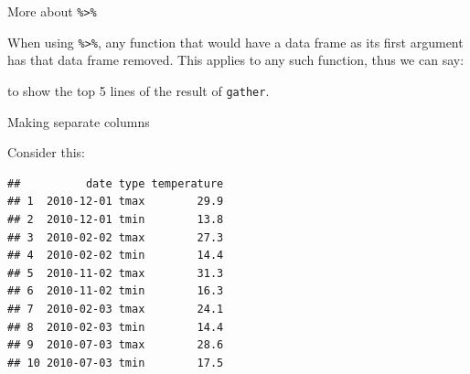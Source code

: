 \begin{frame}[fragile]{More about \texttt{\%>\%}}
    
  When using \texttt{\%>\%}, any function that would have a data frame
  as its first argument has that data frame removed. This applies to
  any such function, thus we can say:
  
\begin{knitrout}
\color{fgcolor}
\end{knitrout}

to show the top 5 lines of the result of \texttt{gather}.
    
  
\end{frame}

\begin{frame}[fragile]{Making separate columns}
  
  Consider this:
  
\begin{knitrout}
\color{fgcolor}\begin{kframe}
\begin{alltt}
\hlkwb{=}\hlstd{(}\hlstd{,}
\end{alltt}
\begin{verbatim}
##          date type temperature
## 1  2010-12-01 tmax        29.9
## 2  2010-12-01 tmin        13.8
## 3  2010-02-02 tmax        27.3
## 4  2010-02-02 tmin        14.4
## 5  2010-11-02 tmax        31.3
## 6  2010-11-02 tmin        16.3
## 7  2010-02-03 tmax        24.1
## 8  2010-02-03 tmin        14.4
## 9  2010-07-03 tmax        28.6
## 10 2010-07-03 tmin        17.5
\end{verbatim}
\end{kframe}
\end{knitrout}

  
\end{frame}

